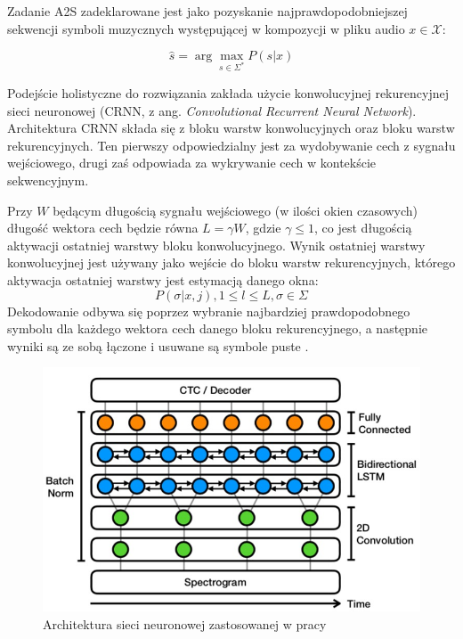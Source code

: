 \documentclass[12pt,a4paper,twoside]{mwart}
\begin{document}
Zadanie A2S zadeklarowane jest jako pozyskanie najprawdopodobniejszej sekwencji symboli muzycznych występującej w kompozycji w pliku audio $x \in \mathcal{X}$:

\begin{equation}
\widehat{s} = \arg \max_{s \in \Sigma^{\ast}} P (s | x)
\end{equation}

Podejście holistyczne do rozwiązania zakłada użycie konwolucyjnej rekurencyjnej sieci neuronowej (CRNN, z ang. \textit{Convolutional Recurrent Neural Network}). Architektura CRNN składa się z bloku warstw konwolucyjnych oraz bloku warstw rekurencyjnych. Ten pierwszy odpowiedzialny jest za wydobywanie cech z sygnału wejściowego, drugi zaś odpowiada za wykrywanie cech w kontekście sekwencyjnym. 

Przy $W$ będącym długością sygnału wejściowego (w ilości okien czasowych) długość wektora cech będzie równa $L = \gamma W$, gdzie $\gamma \leqslant 1$, co jest długością aktywacji ostatniej warstwy bloku konwolucyjnego. Wynik ostatniej warstwy konwolucyjnej jest używany jako wejście do bloku warstw rekurencyjnych, którego aktywacja ostatniej warstwy jest estymacją danego okna:
\begin{equation}
  P(\sigma | x, j), 1 \leqslant l \leqslant L, \sigma \in \Sigma 
\end{equation}
Dekodowanie odbywa się poprzez wybranie najbardziej prawdopodobnego symbolu dla każdego wektora cech danego bloku rekurencyjnego, a następnie wyniki są ze sobą łączone i usuwane są symbole puste \cite[2-5]{Transcription:Pertus:NeuralNetwork}.


\begin{figure}[ht]
  \begin{center}
    \includegraphics[scale=0.31]{images/holisticNetworkArchitecture.jpg}
    \caption{Architektura sieci neuronowej zastosowanej w pracy  \cite{Transcription:Pertus:NeuralNetwork}}
    \label{fig:holisticNetworkArchitecture}%
  \end{center}
\end{figure}
\end{document}
